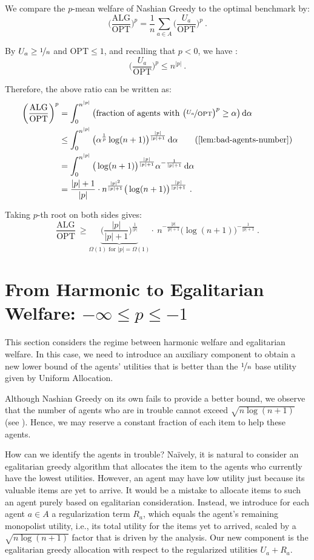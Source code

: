 \documentclass[11pt,letterpaper]{article}
\newcommand{\OPT}{\mathrm{OPT}}
\newcommand{\ALG}{\mathrm{ALG}}
\newcommand{\dif}[1]{\,\text{\rm d} #1}
\newcommand{\utility}{U}
\newcommand{\regularizer}{R}
\begin{document}
We compare the $p$-mean welfare of Nashian Greedy to the optimal benchmark by:
\[
	\bigg( \frac{\ALG}{\OPT} \bigg)^p = \frac{1}{n} \sum_{a\in A} \bigg( \frac{\utility_a}{\OPT} \bigg)^p
	~.
\]

By $\utility_a \ge \nicefrac{1}{n}$ and $\OPT \le 1$, and recalling that $p < 0$, we have :
\[
	\bigg(\frac{\utility_a}{\OPT}\bigg)^p \le n^{|p|}
	~.
\]

Therefore, the above ratio can be written as:
\begin{align*}
	\bigg( \frac{\ALG}{\OPT} \bigg)^p
	& = \int_0^{n^{|p|}} \big(\text{fraction of agents with $\big( \nicefrac{\utility_a}{\OPT} \big)^p \ge \alpha$}\big) \dif{\alpha} \\
	&
	\le \int_0^{n^{|p|}} \big( \alpha^{\frac{1}{p}} \log(n+1) \big)^{\frac{|p|}{|p|+1}} \dif{\alpha} 
	\tag{\Cref{lem:bad-agents-number}} \\
	&
	= \int_0^{n^{|p|}} \big( \log(n+1) \big)^{\frac{|p|}{|p|+1}} \alpha^{-\frac{1}{|p|+1}} \dif{\alpha} \\
	&
	= \frac{|p|+1}{|p|} \cdot n^{\frac{|p|^2}{|p|+1}} \big(\log(n+1) \big)^{\frac{|p|}{|p|+1}}
	~.
\end{align*}

Taking $p$-th root on both sides gives:
\[
	\frac{\ALG}{\OPT} ~\ge \underbrace{\bigg( \frac{|p|}{|p|+1} \bigg)^{\frac{1}{|p|}}}_{\text{$\Omega(1)$ for $|p| = \Omega(1)$}} \cdot~ n^{-\frac{|p|}{|p|+1}} \big(\log(n+1) \big)^{-\frac{1}{|p|+1}}
	~.
\]


 \section[From Harmonic to Egalitarian Welfare]{From Harmonic to Egalitarian Welfare: $-\infty \le p \le -1$}
\label{sec:harmonic-to-egalitarian}

This section considers the regime between harmonic welfare and egalitarian welfare. 
In this case, we need to introduce an auxiliary component to obtain a new lower bound of the agents' utilities that is better than the $\nicefrac{1}{n}$ base utility given by Uniform Allocation.

Although Nashian Greedy on its own fails to provide a better bound, we observe that the number of agents who are in trouble cannot exceed $\sqrt{n \log (n+1)}$ (see ).
Hence, we may reserve a constant fraction of each item to help these agents.

How can we identify the agents in trouble?
Na\"{i}vely, it is natural to consider an egalitarian greedy algorithm that allocates the item to the agents who currently have the lowest utilities.
However, an agent may have low utility just because its valuable items are yet to arrive.
It would be a mistake to allocate items to such an agent purely based on egalitarian consideration.
Instead, we introduce for each agent $a \in A$ a regularization term $\regularizer_a$, which equals the agent's remaining monopolist utility, i.e., its total utility for the items yet to arrived, scaled by a $\sqrt{n \log (n+1)}$ factor that is driven by the analysis.
Our new component is the egalitarian greedy allocation with respect to the regularized utilities $\utility_a + \regularizer_a$.
\end{document}

